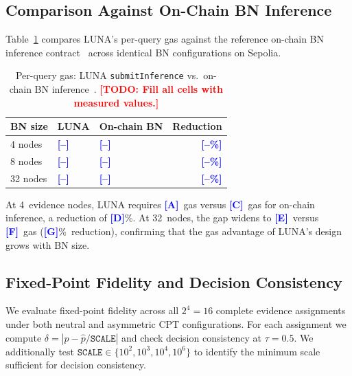\documentclass[journal]{IEEEtran}
\newcommand{\todo}[1]{\textcolor{red}{\textbf{[TODO: #1]}}}
\newcommand{\placeholder}[1]{\textcolor{blue}{\textbf{[#1]}}}
\begin{document}
\subsection{Comparison Against On-Chain BN Inference}
\label{sec:exp-comparison}

Table~\ref{tab:gas-comparison} compares LUNA's
per-query gas against the reference on-chain BN
inference contract~\cite{bn-oracle} across identical
BN configurations on Sepolia.

\begin{table}[t]
\centering
\caption{Per-query gas: LUNA \texttt{submitInference}
vs.\ on-chain BN inference~\cite{bn-oracle}.
\todo{Fill all cells with measured values.}}
\label{tab:gas-comparison}
\begin{tabularx}{\columnwidth}{lXXr}
\toprule
\textbf{BN size} &
\textbf{LUNA} &
\textbf{On-chain BN} &
\textbf{Reduction} \\
\midrule
4 nodes  &
  \placeholder{--} & \placeholder{--} &
  \placeholder{--\%} \\
8 nodes  &
  \placeholder{--} & \placeholder{--} &
  \placeholder{--\%} \\
32 nodes &
  \placeholder{--} & \placeholder{--} &
  \placeholder{--\%} \\
\bottomrule
\end{tabularx}
\end{table}

At 4~evidence nodes, LUNA requires \placeholder{A}~gas
versus \placeholder{C}~gas for on-chain inference, a
reduction of \placeholder{D}\%.
At 32~nodes, the gap widens to \placeholder{E}~versus
\placeholder{F}~gas (\placeholder{G}\%~reduction),
confirming that the gas advantage of LUNA's design
grows with BN size.

\subsection{Fixed-Point Fidelity and Decision
Consistency}
\label{sec:exp-fidelity}

We evaluate fixed-point fidelity across all $2^4=16$
complete evidence assignments under both neutral and
asymmetric CPT configurations. For each assignment
we compute
$\delta=|p-\widehat{p}/\texttt{SCALE}|$ and check
decision consistency at $\tau=0.5$.
We additionally test
$\texttt{SCALE}\in\{10^2,10^3,10^4,10^6\}$ to
identify the minimum scale sufficient for decision
consistency.
\end{document}
